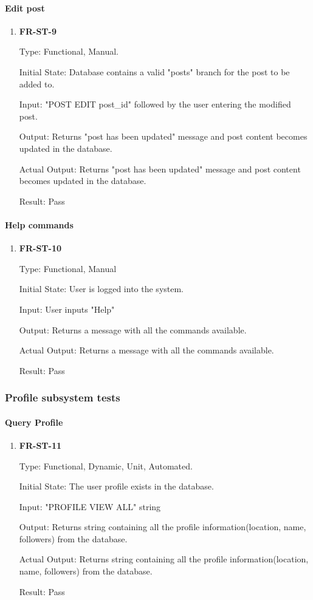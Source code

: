 \documentclass[12pt, titlepage]{article}
\begin{document}
\paragraph{Edit post}	
\begin{enumerate}
\item{\textbf{FR-ST-9}}

Type: Functional, Manual.
					
Initial State: Database contains a valid "posts" branch for the post to be added to.
					
Input: "POST EDIT post\_id" followed by the user entering the modified post.
					
Output: Returns "post has been updated" message and post content becomes updated in the database.


Actual Output: Returns "post has been updated" message and post content becomes updated in the database.
					
Result: Pass
\end{enumerate}

\paragraph{Help commands}	
\begin{enumerate}
\item{\textbf{FR-ST-10}}

Type: Functional, Manual
					
Initial State: User is logged into the system.
					
Input: User inputs "Help"
					
Output: Returns a message with all the commands available.

Actual Output: Returns a message with all the commands available.
					
Result: Pass
\end{enumerate}

\subsubsection{Profile subsystem tests}
		
\paragraph{Query Profile}

\begin{enumerate}

\item{\textbf{FR-ST-11}}

Type: Functional, Dynamic, Unit, Automated.
					
Initial State: The user profile exists in the database.
					
Input: "PROFILE VIEW ALL" string
					
Output: Returns string containing all the profile information(location, name, followers) from the database.


Actual Output: Returns string containing all the profile information(location, name, followers) from the database.
					
Result: Pass
\end{enumerate}
\end{document}
